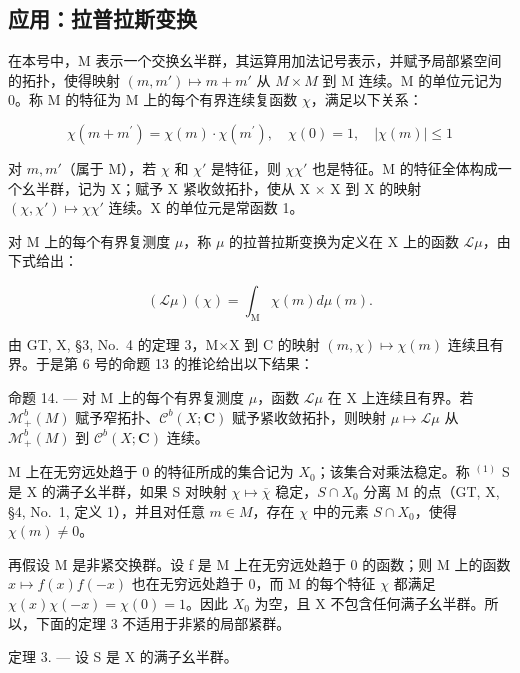 \subsection{应用：拉普拉斯变换}

在本号中，M 表示一个交换幺半群，其运算用加法记号表示，并赋予局部紧空间的拓扑，使得映射 \((m, m') \mapsto m + m'\) 从 \(M \times M\) 到 M 连续。M 的单位元记为 0。称 M 的特征为 M 上的每个有界连续复函数 \(\chi\)，满足以下关系：

\[
\chi (m + m ^ {\prime}) = \chi (m) \cdot \chi (m ^ {\prime}), \quad \chi (0) = 1, \quad | \chi (m) | \leqslant 1\tag{7}
\]

对 \(m, m'\)（属于 M），若 \(\chi\) 和 \(\chi'\) 是特征，则 \(\chi\chi'\) 也是特征。M 的特征全体构成一个幺半群，记为 X；赋予 X 紧收敛拓扑，使从 X × X 到 X 的映射 \((\chi, \chi') \mapsto \chi\chi'\) 连续。X 的单位元是常函数 1。

对 M 上的每个有界复测度 \(\mu\)，称 \(\mu\) 的拉普拉斯变换为定义在 X 上的函数 \(\mathcal{L}\mu\)，由下式给出：

\[
(\mathscr {L} \mu) (\chi) = \int_ {\mathrm{M}} \chi (m) d \mu (m).\tag{8}
\]

由 GT, X, §3, No.~4 的定理 3，M×X 到 C 的映射 \((m,\chi)\mapsto\chi(m)\) 连续且有界。于是第 6 号的命题 13 的推论给出以下结果：

命题 14. --- 对 M 上的每个有界复测度 \(\mu\)，函数 \(\mathcal{L}\mu\) 在 X 上连续且有界。若 \(\mathcal{M}_{+}^{b}(M)\) 赋予窄拓扑、\(\mathcal{C}^{b}(X; \mathbf{C})\) 赋予紧收敛拓扑，则映射 \(\mu \mapsto \mathcal{L}\mu\) 从 \(\mathcal{M}_{+}^{b}(M)\) 到 \(\mathcal{C}^{b}(X; \mathbf{C})\) 连续。

M 上在无穷远处趋于 0 的特征所成的集合记为 \(X_{0}\)；该集合对乘法稳定。称 \(^{(1)}\) S 是 X 的满子幺半群，如果 S 对映射 \(\chi\mapsto\overline{\chi}\) 稳定，\(S\cap X_{0}\) 分离 M 的点（GT, X, §4, No.~1, 定义 1），并且对任意 \(m\in M\)，存在 \(\chi\) 中的元素 \(S\cap X_{0}\)，使得 \(\chi(m)\neq0\)。

再假设 M 是非紧交换群。设 f 是 M 上在无穷远处趋于 0 的函数；则 M 上的函数 \(x \mapsto f(x)f(-x)\) 也在无穷远处趋于 0，而 M 的每个特征 \(\chi\) 都满足 \(\chi(x)\chi(-x) = \chi(0) = 1\)。因此 \(X_{0}\) 为空，且 X 不包含任何满子幺半群。所以，下面的定理 3 不适用于非紧的局部紧群。

定理 3. --- 设 S 是 X 的满子幺半群。

